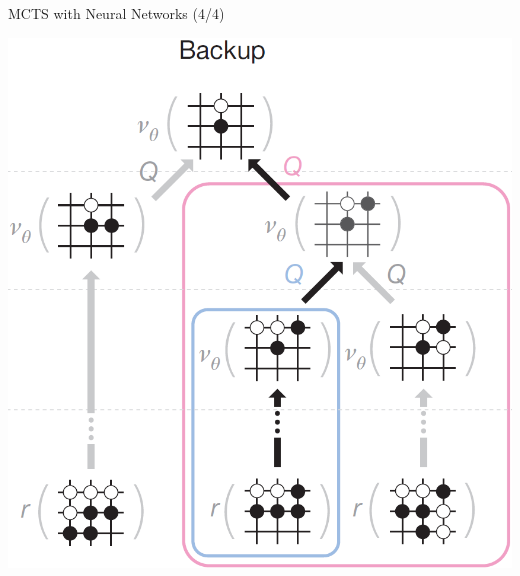\documentclass{beamer}
\begin{document}
{    \begin{frame}{MCTS with Neural Networks (4/4)}
      \begin{center}
        \includegraphics[height=.85\textheight]{../img/MCTS_backup.png}
      \end{center}
    \end{frame}

}
\end{document}
